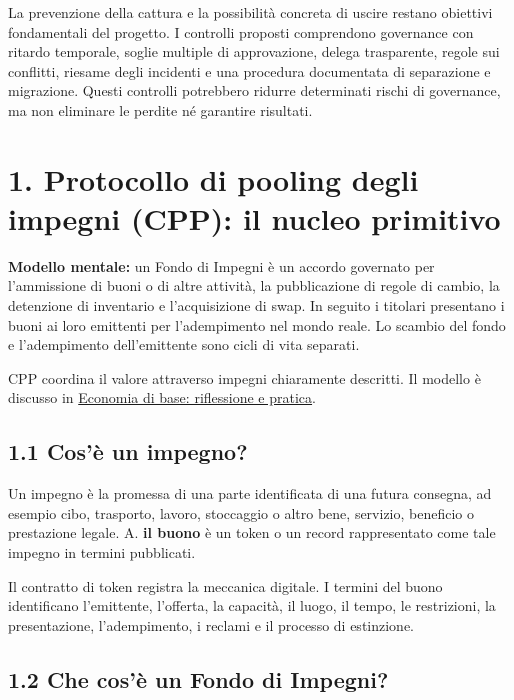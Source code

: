 \documentclass[11pt]{article}
\begin{document}
La prevenzione della cattura e la possibilità concreta di uscire restano obiettivi fondamentali del progetto. I controlli proposti comprendono governance con ritardo temporale, soglie multiple di approvazione, delega trasparente, regole sui conflitti, riesame degli incidenti e una procedura documentata di separazione e migrazione. Questi controlli potrebbero ridurre determinati rischi di governance, ma non eliminare le perdite né garantire risultati.


\section*{1. Protocollo di pooling degli impegni (CPP): il nucleo primitivo}

\textbf{Modello mentale:} un Fondo di Impegni è un accordo governato per l'ammissione di buoni o di altre attività, la pubblicazione di regole di cambio, la detenzione di inventario e l'acquisizione di swap. In seguito i titolari presentano i buoni ai loro emittenti per l'adempimento nel mondo reale. Lo scambio del fondo e l'adempimento dell'emittente sono cicli di vita separati.

CPP coordina il valore attraverso impegni chiaramente descritti. Il modello è discusso in \href{https://willruddick.substack.com/p/grassroots-economics-the-book-is}{Economia di base: riflessione e pratica}.

\subsection*{1.1 Cos'è un impegno?}

Un impegno è la promessa di una parte identificata di una futura consegna, ad esempio cibo, trasporto, lavoro, stoccaggio o altro bene, servizio, beneficio o prestazione legale. A. \textbf{il buono} è un token o un record rappresentato come tale impegno in termini pubblicati.

Il contratto di token registra la meccanica digitale. I termini del buono identificano l'emittente, l'offerta, la capacità, il luogo, il tempo, le restrizioni, la presentazione, l'adempimento, i reclami e il processo di estinzione.

\subsection*{1.2 Che cos'è un Fondo di Impegni?}
\end{document}

